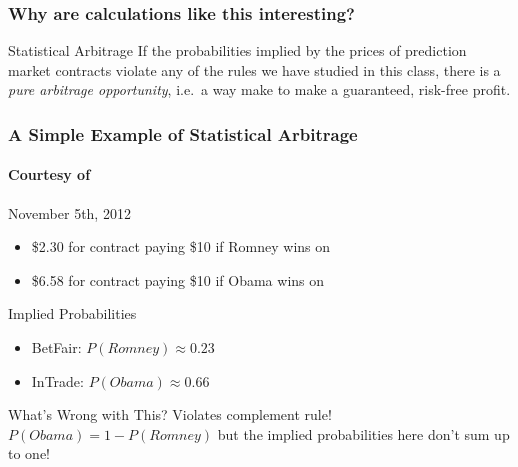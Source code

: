 \documentclass[handout]{beamer}
\begin{document}
\begin{frame}
\frametitle{Why are calculations like this interesting?}
	\begin{alertblock}{Statistical Arbitrage}
	If the probabilities implied by the prices of prediction market contracts violate any of the rules we have studied in this class, there is a \emph{pure arbitrage opportunity}, i.e.\ a way make to make a guaranteed, risk-free profit.
	\end{alertblock}
\end{frame}
\begin{frame}
\frametitle{A Simple Example of Statistical Arbitrage}
\framesubtitle{Courtesy of  }

\begin{block}{November 5th, 2012}
	\begin{itemize}
		\item\$2.30 for contract paying \$10 if Romney wins on  
		\item \$6.58 for contract paying \$10 if Obama wins on  
	\end{itemize}
\end{block}

\begin{block}{Implied Probabilities}
	\begin{itemize}
	\item BetFair: $P(Romney) \approx 0.23$
	\item InTrade: $P(Obama) \approx 0.66$
	\end{itemize}
\end{block}

\begin{alertblock}{What's Wrong with This?}\pause
 Violates complement rule! $P(Obama) = 1 - P(Romney)$ but the implied probabilities here don't sum up to one!
\end{alertblock}



\end{frame}
\end{document}
